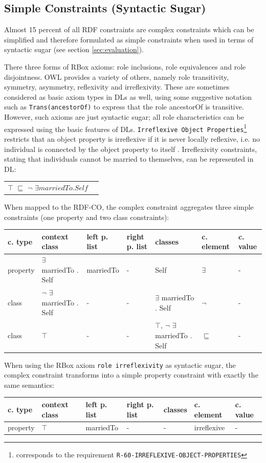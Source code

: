 \documentclass{llncs}
\newcommand{\ms}[1]{\texttt{#1}}
\newenvironment{gcotable}{
  \scriptsize
  \sffamily
  \vspace{0.3cm}
	\begin{center}
  \begin{tabular}{l|l|l|l|l|l|l}
  \hline
  \textbf{c. type} & \textbf{context class} & \textbf{left p. list} & \textbf{right p. list} & \textbf{classes} & \textbf{c. element} & \textbf{c. value} \\
  \hline

}{
  \hline
  \end{tabular}
	\end{center}
}
\newenvironment{DL}{
  \vspace{0.3cm}
	\begin{center}
  \begin{tabular}{r l}

}{
  \end{tabular}
	\end{center}
}
\begin{document}
\subsection{Simple Constraints (Syntactic Sugar)}

Almost 15 percent of all RDF constraints are complex constraints which can be simplified and therefore formulated as simple constraints when used in terms of syntactic sugar (see section \ref{sec:evaluation}).

There three forms of RBox axioms: role inclusions, role equivalences and role disjointness. 
OWL provides a variety of others, namely role transitivity, symmetry, asymmetry, reflexivity and irreflexivity. 
These are sometimes considered as basic axiom types in DLs as well, using some suggestive notation such as
\ms{Trans(ancestorOf)} to express that the role ancestorOf is transitive. 
However, such axioms are just syntactic sugar; 
all role characteristics can be expressed using the basic features of DLs.
\ms{Irreflexive Object Properties}\footnote{corresponds to the requirement \ms{R-60-IRREFLEXIVE-OBJECT-PROPERTIES}}
restricts that an object property is irreflexive if it is never locally reflexive, i.e. no individual is connected by the object property to itself \cite{Kroetzsch2012}.
Irreflexivity constraints, stating that individuals cannot be married to themselves, can be represented in DL:

\begin{DL}
$\top$ $\sqsubseteq$ $\neg$ $\exists  marriedTo . Self$
\end{DL}

When mapped to the RDF-CO, the complex constraint aggregates three simple constraints (one property and two class constraints):

\begin{gcotable}
property & $\exists$ marriedTo . Self & marriedTo & - & Self & $\exists$ & - \\
class & $\neg$ $\exists$ marriedTo . Self & - & - & $\exists$ marriedTo . Self & $\neg$ & - \\
class & $\top$ & - & - & $\top$, $\neg$ $\exists$ marriedTo . Self & $\sqsubseteq$ & - \\
\end{gcotable}

When using the RBox axiom \ms{role irreflexivity} as syntactic sugar, 
the complex constraint transforms into a simple property constraint with exactly the same semantics:

\begin{gcotable}
property & $\top$ & marriedTo & - & - & irreflexive & - \\
\end{gcotable}
\end{document}

